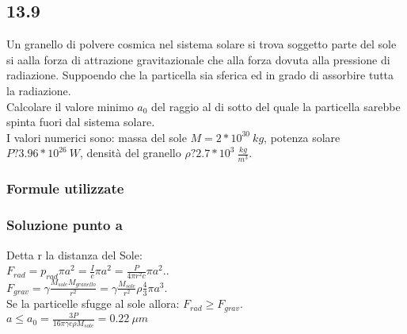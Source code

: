 \documentclass[../../main.tex]{subfiles}
\begin{document}
\subsection*{13.9}
Un granello di polvere cosmica nel sistema solare si trova soggetto parte del sole si aalla forza di attrazione gravitazionale che alla forza dovuta alla pressione di radiazione. Suppoendo che la particella sia sferica ed in grado di assorbire tutta la radiazione.\\
Calcolare il valore minimo $a_0$ del raggio al di sotto del quale la particella sarebbe spinta fuori dal sistema solare.\\
I valori numerici sono: massa del sole $M = 2 * 10^30\ kg$, potenza solare $P ? 3.96 * 10^{26}\ W$, densità del granello $\rho ? 2.7 * 10^3\ \frac{kg}{m^3}$.
\subsubsection*{Formule utilizzate}
\subsubsection*{Soluzione punto a}
Detta r la distanza del Sole:\\
$F_{rad} = p_{rad} \pi a^2 = \frac{I}{c}\pi a^2 = \frac{P}{4\pi r^2 c}\pi a^2.$.\\
$F_{grav} = \gamma\frac{M_{sole}M_{granello}}{r^2} = \gamma \frac{M_{sole}}{r^2}\rho\frac{4}{3}\pi a^3$.\\
Se la particelle sfugge al sole allora: $F_{rad} \ge F_{grav}$.\\
$a \le a_0 = \frac{3P}{16\pi \gamma c \rho M_{sole}} = 0.22\ \mu m$
\newpage
\end{document}
